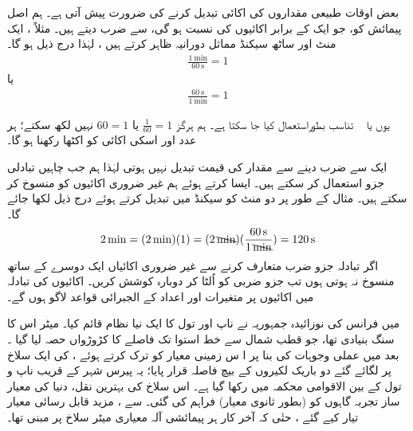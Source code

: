 بعض اوقات طبیعی  مقداروں کی اکائی تبدیل کرنے کی ضرورت پیش آتی ہے۔ ہم اصل پیمائش کو، جو  ایک  کے برابر اکائیوں کی نسبت ہو گی، سے ضرب دیتے ہیں۔ مثلاً ، ایک منٹ اور ساٹھ سیکنڈ مماثل دورانیہ ظاہر کرتے ہیں ، لہٰذا درج ذیل ہو گا۔
\begin{align*}
\frac{\SI{1}{\minute}}{\SI{60}{\second}} = 1
\end{align*}
یا
\begin{align*}
\frac{\SI{60}{\second}}{\SI{1}{\minute}} = 1
\end{align*}

یوں     یا \   تناسب  بطوراستعمال کیا جا سکتا ہے۔ ہم ہرگز \(\frac{1}{60}=1\) یا \(60 = 1\) نہیں لکھ سکتے؛  ہر عدد اور اسکی اکائی کو اکٹھا رکھنا ہو گا۔

ایک   سے ضرب دینے سے مقدار کی قیمت تبدیل نہیں ہوتی لہٰذا ہم جب  چاہیں تبادلی جزو  استعمال کر سکتے ہیں۔ ایسا کرتے ہوئے ہم غیر ضروری اکائیوں کو منسوخ کر سکتے ہیں۔ مثال کے طور پر دو منٹ  کو سیکنڈ  میں تبدیل کرتے ہوئے درج ذیل لکھا جائے گا۔
\begin{align}
\SI{2}{\minute} = (\SI{2}{\minute})(1) = (\SI{2}{\bcancel{\mathrm{\minute}}})(\frac{\SI{60}{\second}}{\SI{1}{\bcancel{\mathrm{\minute}}}}) = \SI{120}{\second}
\end{align}
اگر تبادلہ جزو ضرب متعارف  کرنے سے غیر  ضروری  اکائیاں ایک دوسرے کے ساتھ منسوخ نہ ہوتی ہوں تب جزو ضربی کو اُلٹا کر دوبارہ کوشش کریں۔ اکائیوں کی تبادلہ میں اکائیوں پر متغیرات اور اعداد کے الجبرائی قواعد لاگو ہوں گے۔

 میں فرانس کی نوزائیدہ جمہوریہ نے ناپ اور تول کا ایک نیا نظام قائم کیا۔ میٹر اس کا سنگ بنیادی تھا،  جو قطب شمال سے خط استوا تک  فاصلے کا کڑوڑواں حصہ لیا گیا ۔ بعد میں عملی وجوہات کی  بنا    پر ا س زمینی معیار کو ترک کرتے ہوئے ،   کی  ایک سلاخ  پر لگائے گئے دو باریک لکیروں کے بیچ فاصلہ    قرار  پایا؛ یہ  پیرس شہر کے قریب ناپ  و  تول کے   بین الاقوامی محکمہ میں رکھا گیا ہے۔  اس سلاخ کی  بہترین نقل،  دنیا کی معیار ساز تجربہ گاہوں کو   (بطور ثانوی معیار)  فراہم کی گئی۔  سے ، مزید  قابل رسائی معیار تیار کیے گئے    ، حتٰی کہ آخر کار ہر پیمائشی آلہ  معیاری میٹر سلاخ  پر مبنی تھا۔ 

